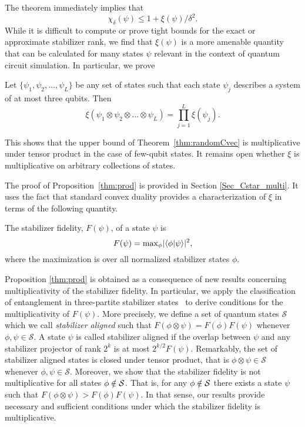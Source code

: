 The theorem immediately implies that 
\begin{equation}
\label{cstar}
\chi_\delta(\psi) \leq 1+\xi(\psi) / \delta^2.
\end{equation}
While it is difficult to compute or prove tight bounds for the exact or approximate stabilizer rank, 
we find that $\xi(\psi)$ is a more amenable quantity that can 
be calculated   for many states  $\psi$ relevant in the context of quantum circuit
simulation. 
In particular, we prove 
\begin{prop}
	\label{multi}
Let $\{ \psi_1,\psi_2,\ldots, \psi_L \}$ be any set of states 
such that each state $\psi_j$ describes a system of at most three qubits.
	Then
	\begin{equation}
	\xi( \psi_1 \otimes \psi_2  \otimes  \ldots \otimes \psi_L) = \prod_{j=1}^L \xi(\psi_j)  .
	\end{equation}
	\label{thm:prod}
\end{prop}
\noindent
This shows that the upper bound of Theorem~\ref{thm:randomCvec} is multiplicative under tensor product in the case of few-qubit states. It remains open whether $\xi$ is multiplicative on arbitrary collections of states.  

The proof of Proposition~\ref{thm:prod} is provided in Section \ref{Sec_Cstar_multi}.  It uses the fact that standard convex duality provides a characterization of $\xi$ in terms of the following quantity. 
\begin{dfn}
The stabilizer fidelity, $F(\psi)$, of a state $\psi$ is 
\begin{equation}
F( \psi ) = \mathrm{max}_{\phi} |\langle \phi\vert \psi\rangle|^2,
\label{eq:stabfid}
\end{equation}
where the maximization is over all normalized stabilizer states $\phi$.
\end{dfn}
Proposition \ref{thm:prod} is obtained as a consequence of new results concerning multiplicativity of the stabilizer fidelity. In particular, we apply the classification of entanglement
in three-partite stabilizer states~\cite{ghz}
to derive conditions for the multiplicativity  of $F(\psi)$. 
More precisely, we define a set of quantum states $\mathcal{S}$ which
we call {\em stabilizer aligned} such that 
$F(\phi \otimes \psi) =F(\phi)F(\psi)$ whenever $\phi,\psi\in \mathcal{S}$. 
A state  $\psi$ is called stabilizer aligned
if  the overlap between $\psi$ and any stabilizer projector of rank $2^k$
is at most $2^{k/2} F(\psi)$. 
Remarkably, the set of stabilizer aligned states is closed under tensor product, that is $\phi\otimes \psi \in \mathcal{S}$ whenever $\phi,\psi\in \mathcal{S}$.
Moreover, we show that the stabilizer fidelity is not multiplicative for all states
$\phi \notin {\cal S }$. That is, for any $\phi \notin {\cal S }$ there exists a state $\psi$
such that $F(\phi\otimes \psi)>F(\phi) F(\psi)$. In that sense, our results provide
necessary and sufficient conditions under which the stabilizer fidelity is multiplicative. 

